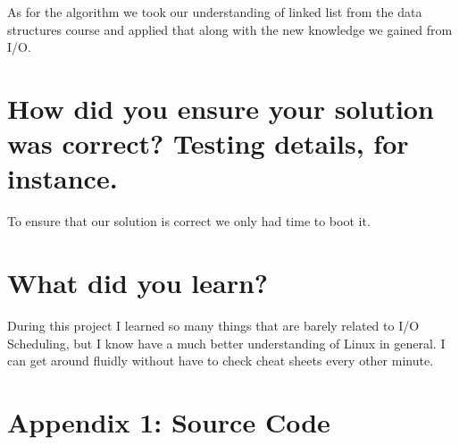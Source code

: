 \documentclass[letterpaper,10pt]{article}
\begin{document}
As for the algorithm we took our understanding of linked list from the data structures course and applied that along with the new knowledge we gained from I/O. 
\section{How did you ensure your solution was correct? Testing details, for instance.}
To ensure that our solution is correct we only had time to boot it.

\section{What did you learn?}
During this project I learned so many things that are barely related to I/O Scheduling, but I know have a much better understanding of Linux in general. I can get around fluidly without have to check cheat sheets every other minute.


\newpage

\section*{Appendix 1: Source Code}

\end{document}

